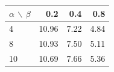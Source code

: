 \documentclass[
]{article}
\begin{document}
\begin{table}[t]
\begin{minipage}{0.49\linewidth}
\vspace{1.0em}

\label{tab:sim_sd_2000}
\begin{tabular}{lrrr}
\toprule
$\alpha$ $\backslash$ $\beta$ & 0.2 & 0.4 & 0.8 \\
\midrule
4  & 10.96 & 7.22 & 4.84 \\
8  & 10.93 & 7.50 & 5.11 \\
10 & 10.69 & 7.66 & 5.36 \\
\bottomrule
\end{tabular}
\end{minipage}
\end{table}
\end{document}
